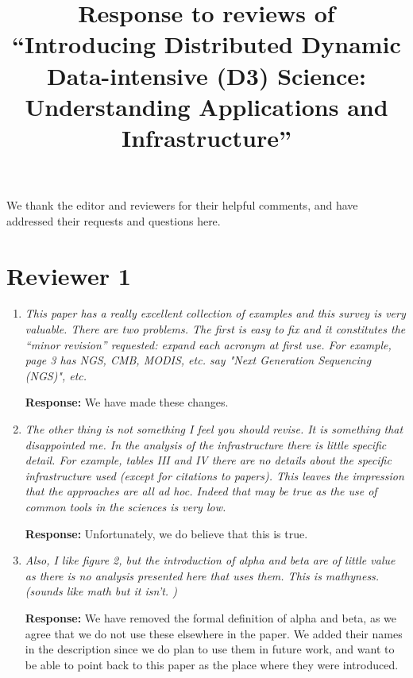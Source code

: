 \documentclass{article}
\begin{document}
\title{Response to reviews of ``Introducing Distributed Dynamic Data-intensive (D3) Science: Understanding Applications and Infrastructure''}
\maketitle

We thank the editor and reviewers for their helpful comments, and have addressed their requests and questions here.

\section{Reviewer 1}

\begin{enumerate}
\item \emph{This paper has a really excellent collection of examples and this survey is very valuable. There are two problems. The first is easy to fix and it constitutes the ``minor revision'' requested: expand each acronym at first use. For example, page 3 has NGS, CMB, MODIS, etc. say "Next Generation Sequencing (NGS)", etc.}

\textbf{Response:} We have made these changes.


\item \emph{The other thing is not something I feel you should revise. It is something that disappointed me. In the analysis of the infrastructure there is little specific detail. For example, tables III and IV there are no details about the specific infrastructure used (except for citations to papers). This leaves the impression that the approaches are all ad hoc. Indeed that may be true as the use of common tools in the sciences is very low.}

\textbf{Response:} Unfortunately, we do believe that this is true.

\item \emph{Also, I like figure 2, but the introduction of alpha and beta are of little value as there is no analysis presented here that uses them. This is mathyness. (sounds like math but it isn't. )}

\textbf{Response:} We have removed the formal definition of alpha and beta, as we agree that we do not use these elsewhere in the paper.  We added their names in the description since we do plan to use them in future work, and want to be able to point back to this paper as the place where they were introduced.
\end{enumerate}
\end{document}
